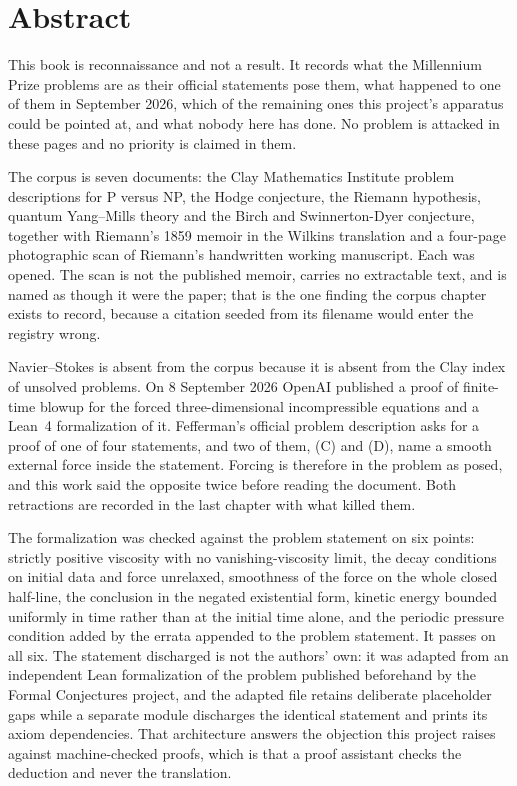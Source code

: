 \chapter*{Abstract}

This book is reconnaissance and not a result. It records what the Millennium Prize problems are as
their official statements pose them, what happened to one of them in September 2026, which of the
remaining ones this project's apparatus could be pointed at, and what nobody here has done. No
problem is attacked in these pages and no priority is claimed in them.

The corpus is seven documents: the Clay Mathematics Institute problem descriptions for P versus NP,
the Hodge conjecture, the Riemann hypothesis, quantum Yang--Mills theory and the Birch and
Swinnerton-Dyer conjecture, together with Riemann's 1859 memoir in the Wilkins translation and a
four-page photographic scan of Riemann's handwritten working manuscript. Each was opened. The scan
is not the published memoir, carries no extractable text, and is named as though it were the paper;
that is the one finding the corpus chapter exists to record, because a citation seeded from its
filename would enter the registry wrong.

Navier--Stokes is absent from the corpus because it is absent from the Clay index of unsolved
problems. On 8 September 2026 OpenAI published a proof of finite-time blowup for the forced
three-dimensional incompressible equations and a Lean~4 formalization of it. Fefferman's official
problem description asks for a proof of one of four statements, and two of them, (C) and (D), name a
smooth external force inside the statement. Forcing is therefore in the problem as posed, and this
work said the opposite twice before reading the document. Both retractions are recorded in the
last chapter with what killed them.

The formalization was checked against the problem statement on six points: strictly positive
viscosity with no vanishing-viscosity limit, the decay conditions on initial data and force
unrelaxed, smoothness of the force on the whole closed half-line, the conclusion in the negated
existential form, kinetic energy bounded uniformly in time rather than at the initial time alone,
and the periodic pressure condition added by the errata appended to the problem statement. It passes
on all six. The statement discharged is not the authors' own: it was adapted from an independent
Lean formalization of the problem published beforehand by the Formal Conjectures project, and the
adapted file retains deliberate placeholder gaps while a separate module discharges the identical
statement and prints its axiom dependencies. That architecture answers the objection this project
raises against machine-checked proofs, which is that a proof assistant checks the deduction and
never the translation.


